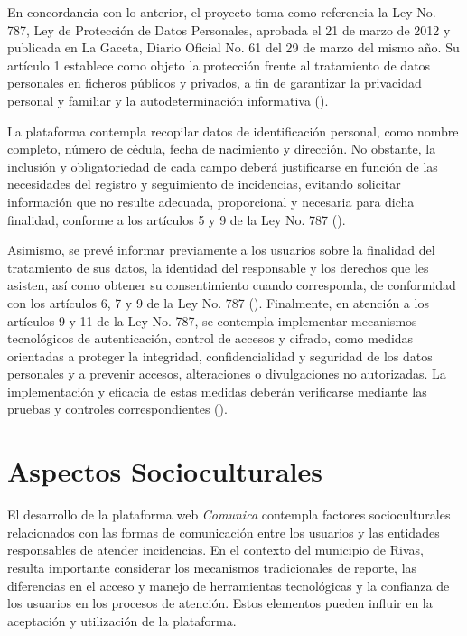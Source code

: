En concordancia con lo anterior, el proyecto toma como referencia la Ley No. 787, Ley de Protección de Datos Personales, aprobada el 21 de marzo de 2012 y publicada en La Gaceta, Diario Oficial No. 61 del 29 de marzo del mismo año. Su artículo 1 establece como objeto la protección frente al tratamiento de datos personales en ficheros públicos y privados, a fin de garantizar la privacidad personal y familiar y la autodeterminación informativa (\cite{asamblea2012ley787}).

La plataforma contempla recopilar datos de identificación personal, como nombre completo, número de cédula, fecha de nacimiento y dirección. No obstante, la inclusión y obligatoriedad de cada campo deberá justificarse en función de las necesidades del registro y seguimiento de incidencias, evitando solicitar información que no resulte adecuada, proporcional y necesaria para dicha finalidad, conforme a los artículos 5 y 9 de la Ley No. 787 (\cite{asamblea2012ley787}).

Asimismo, se prevé informar previamente a los usuarios sobre la finalidad del tratamiento de sus datos, la identidad del responsable y los derechos que les asisten, así como obtener su consentimiento cuando corresponda, de conformidad con los artículos 6, 7 y 9 de la Ley No. 787 (\cite{asamblea2012ley787}). 
Finalmente, en atención a los artículos 9 y 11 de la Ley No. 787, se contempla implementar mecanismos tecnológicos de autenticación, control de accesos y cifrado, como medidas orientadas a proteger la integridad, confidencialidad y seguridad de los datos personales y a prevenir accesos, alteraciones o divulgaciones no autorizadas. La implementación y eficacia de estas medidas deberán verificarse mediante las pruebas y controles correspondientes (\cite{asamblea2012ley787}).

\section{Aspectos Socioculturales}
El desarrollo de la plataforma web \textit{Comunica} contempla factores socioculturales relacionados con las formas de comunicación entre los usuarios y las entidades responsables de atender incidencias. En el contexto del municipio de Rivas, resulta importante considerar los mecanismos tradicionales de reporte, las diferencias en el acceso y manejo de herramientas tecnológicas y la confianza de los usuarios en los procesos de atención. Estos elementos pueden influir en la aceptación y utilización de la plataforma.

